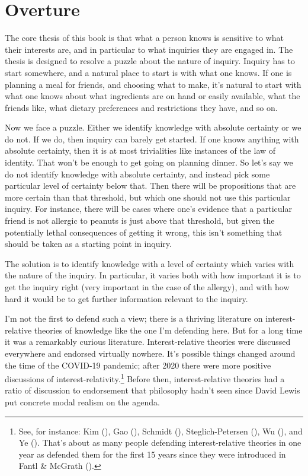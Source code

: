 \documentclass[
  10pt,
  letterpaper,
  twoside]{scrbook}
\begin{document}

\chapter{Overture}\label{sec-overture}

The core thesis of this book is that what a person knows is sensitive to
what their interests are, and in particular to what inquiries they are
engaged in. The thesis is designed to resolve a puzzle about the nature
of inquiry. Inquiry has to start somewhere, and a natural place to start
is with what one knows. If one is planning a meal for friends, and
choosing what to make, it's natural to start with what one knows about
what ingredients are on hand or easily available, what the friends like,
what dietary preferences and restrictions they have, and so on.

Now we face a puzzle. Either we identify knowledge with absolute
certainty or we do not. If we do, then inquiry can barely get started.
If one knows anything with absolute certainty, then it is at most
trivialities like instances of the law of identity. That won't be enough
to get going on planning dinner. So let's say we do not identify
knowledge with absolute certainty, and instead pick some particular
level of certainty below that. Then there will be propositions that are
more certain than that threshold, but which one should not use this
particular inquiry. For instance, there will be cases where one's
evidence that a particular friend is not allergic to peanuts is just
above that threshold, but given the potentially lethal consequences of
getting it wrong, this isn't something that should be taken as a
starting point in inquiry.

The solution is to identify knowledge with a level of certainty which
varies with the nature of the inquiry. In particular, it varies both
with how important it is to get the inquiry right (very important in the
case of the allergy), and with how hard it would be to get further
information relevant to the inquiry.

I'm not the first to defend such a view; there is a thriving literature
on interest-relative theories of knowledge like the one I'm defending
here. But for a long time it was a remarkably curious literature.
Interest-relative theories were discussed everywhere and endorsed
virtually nowhere. It's possible things changed around the time of the
COVID-19 pandemic; after 2020 there were more positive discussions of
interest-relativity.\footnote{See, for instance: Kim
  (), Gao (),
  Schmidt (), Steglich-Petersen
  (), Wu
  (), and Ye
  (). That's about as many people defending
  interest-relative theories in one year as defended them for the first
  15 years since they were introduced in Fantl \& McGrath
  ().} Before then,
interest-relative theories had a ratio of discussion to endorsement that
philosophy hadn't seen since David Lewis put concrete modal realism on
the agenda.
\end{document}
